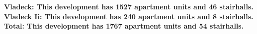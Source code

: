 \bf{Vladeck}: This development has 1527 apartment units and 46 stairhalls.\\\bf{Vladeck Ii}: This development has 240 apartment units and 8 stairhalls.\\\bf{Total}: This development has 1767 apartment units and 54 stairhalls.\\
